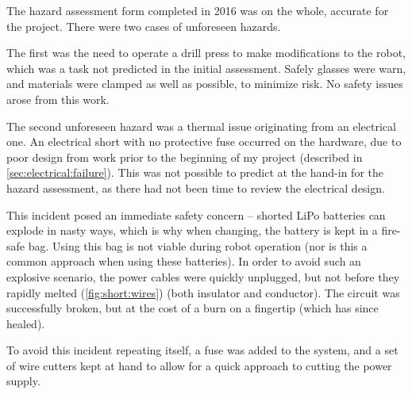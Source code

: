 \documentclass[main.tex]{subfiles}
\begin{document}
The hazard assessment form completed in 2016 was on the whole, accurate for the project.
There were two cases of unforeseen hazards.

The first was the need to operate a drill press to make modifications to the robot, which was a task not predicted in the initial assessment.
Safely glasses were warn, and materials were clamped as well as possible, to minimize risk.
No safety issues arose from this work.

The second unforeseen hazard was a thermal issue originating from an electrical one.
An electrical short with no protective fuse occurred on the hardware, due to poor design from work prior to the beginning of my project (described in \cref{sec:electrical:failure}).
This was not possible to predict at the hand-in for the hazard assessment, as there had not been time to review the electrical design.

This incident posed an immediate safety concern -- shorted LiPo batteries can explode in nasty ways, which is why when changing, the battery is kept in a fire-safe bag.
Using this bag is not viable during robot operation (nor is this a common approach when using these batteries).
In order to avoid such an explosive scenario, the power cables were quickly unplugged, but not before they rapidly melted (\cref{fig:short:wires}) (both insulator and conductor).
The circuit was successfully broken, but at the cost of a burn on a fingertip (which has since healed).

To avoid this incident repeating itself, a fuse was added to the system, and a set of wire cutters kept at hand to allow for a quick approach to cutting the power supply.
\end{document}
